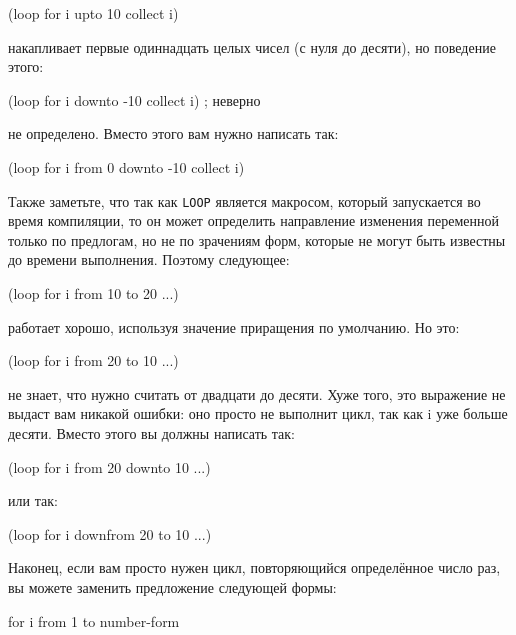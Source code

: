 \begin{myverb}
(loop for i upto 10 collect i)
\end{myverb}

\noindent{}накапливает первые одиннадцать целых чисел (с нуля до десяти), но поведение этого:

\begin{myverb}
(loop for i downto -10 collect i)         ; неверно
\end{myverb}

\noindent{}не определено. Вместо этого вам нужно написать так:

\begin{myverb}
(loop for i from 0 downto -10 collect i)
\end{myverb}

Также заметьте, что так как \lstinline{LOOP} является макросом, который запускается во время
компиляции, то он может определить направление изменения переменной только по предлогам,
но не по зрачениям форм, которые не могут быть известны до времени выполнения. Поэтому
следующее:

\begin{myverb}
(loop for i from 10 to 20 ...) 
\end{myverb}

\noindent{}работает хорошо, используя значение приращения по умолчанию. Но это:

\begin{myverb}
(loop for i from 20 to 10 ...)
\end{myverb}

\noindent{}не знает, что нужно считать от двадцати до десяти. Хуже того, это выражение не выдаст вам
никакой ошибки: оно просто не выполнит цикл, так как i уже больше десяти. Вместо этого вы
должны написать так:

\begin{myverb}
(loop for i from 20 downto 10 ...)
\end{myverb}

\noindent{}или так:

\begin{myverb}
(loop for i downfrom 20 to 10 ...)
\end{myverb}

Наконец, если вам просто нужен цикл, повторяющийся определённое число раз, вы можете
заменить предложение следующей формы:

\begin{myverb}
for i from 1 to number-form
\end{myverb}

